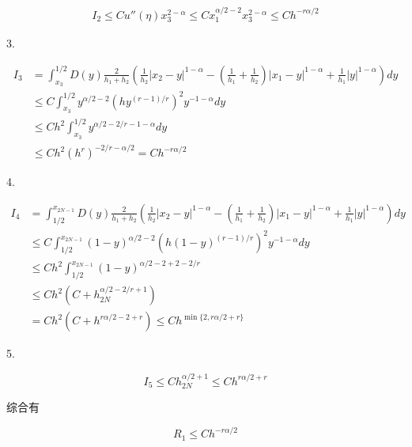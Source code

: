 \documentclass{ctexart}
\begin{document}
\begin{equation}
    \begin{aligned}
        I_2 \le C u''(\eta) x_3^{2-\alpha} \le C x_1^{\alpha/2-2} x_3^{2-\alpha} \le C h^{-r\alpha/2}
    \end{aligned}
\end{equation}

3.

\begin{equation}
    \begin{aligned}
        I_3 &= \int_{x_3}^{1/2}D(y) \frac{2}{h_1 + h_{2}} 
        ( \frac{1}{h_{2}} |x_{2}-y|^{1-\alpha} 
        - (\frac{1}{h_{1}}+\frac{1}{h_{2}}) |x_{1}-y|^{1-\alpha}
        +  \frac{1}{h_{1}}|y|^{1-\alpha} )  dy      \\
        &\le C \int_{x_3}^{1/2} y^{\alpha/2-2} (h y^{(r-1)/r})^2 y^{-1-\alpha} dy \\
        &\le C h^2 \int_{x_3}^{1/2} y^{\alpha/2 - 2/r -1 - \alpha} dy       \\
        &\le C h^2 (h^r)^{-2/r-\alpha/2} = C h^{-r\alpha/2}
    \end{aligned}
\end{equation}


4. 

\begin{equation}
    \begin{aligned}
        I_4 &= \int_{1/2}^{x_{2N-1}}D(y) \frac{2}{h_1 + h_{2}} 
        ( \frac{1}{h_{2}} |x_{2}-y|^{1-\alpha} 
        - (\frac{1}{h_{1}}+\frac{1}{h_{2}}) |x_{1}-y|^{1-\alpha}
        +  \frac{1}{h_{1}}|y|^{1-\alpha} )  dy      \\
        &\le C \int_{1/2}^{x_{2N-1}} (1-y)^{\alpha/2-2} (h (1-y)^{(r-1)/r})^2 y^{-1-\alpha} dy  \\
        &\le C h^2 \int_{1/2}^{x_{2N-1}} (1-y)^{\alpha/2-2 + 2 - 2/r}       \\
        &\le C h^2 (C + h_{2N}^{\alpha/2-2/r+1})        \\
        &= C h^2 (C + h^{r\alpha/2-2+r}) \le C h^{\min\{2, r\alpha/2+r\}}
    \end{aligned}
\end{equation}

5.

\begin{equation}
    I_5 \le C h_{2N}^{\alpha/2+1} \le C h^{r\alpha/2+r}
\end{equation}

综合有

\begin{equation}
    R_1 \le C h^{-r\alpha/2}
\end{equation}
\end{document}
